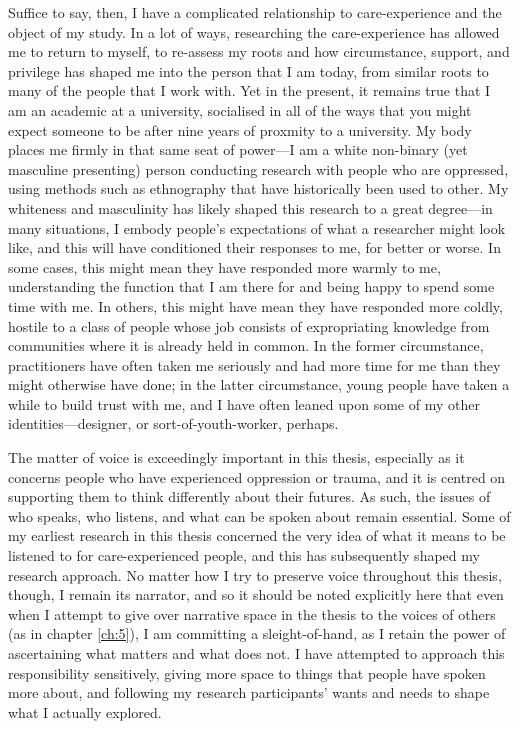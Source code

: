 Suffice to say, then, I have a complicated relationship to care-experience and the object of my study. In a lot of ways, researching the care-experience has allowed me to return to myself, to re-assess my roots and how circumstance, support, and privilege has shaped me into the person that I am today, from similar roots to many of the people that I work with. Yet in the present, it remains true that I am an academic at a university, socialised in all of the ways that you might expect someone to be after nine years of proxmity to a university. My body places me firmly in that same seat of power—I am a white non-binary (yet masculine presenting) person conducting research with people who are oppressed, using methods such as ethnography that have historically been used to other. My whiteness and masculinity has likely shaped this research to a great degree—in many situations, I embody people’s expectations of what a researcher might look like, and this will have conditioned their responses to me, for better or worse. In some cases, this might mean they have responded more warmly to me, understanding the function that I am there for and being happy to spend some time with me. In others, this might have mean they have responded more coldly, hostile to a class of people whose job consists of expropriating knowledge from communities where it is already held in common. In the former circumstance, practitioners have often taken me seriously and had more time for me than they might otherwise have done; in the latter circumstance, young people have taken a while to build trust with me, and I have often leaned upon some of my other identities—designer, or sort-of-youth-worker, perhaps. 

The matter of voice is exceedingly important in this thesis, especially as it concerns people who have experienced oppression or trauma, and it is centred on supporting them to think differently about their futures. As such, the issues of who speaks, who listens, and what can be spoken about remain essential. Some of my earliest research in this thesis concerned the very idea of what it means to be listened to for care-experienced people, and this has subsequently shaped my research approach. No matter how I try to preserve voice throughout this thesis, though, I remain its narrator, and so it should be noted explicitly here that even when I attempt to give over narrative space in the thesis to the voices of others (as in chapter \ref{ch:5}), I am committing a sleight-of-hand, as I retain the power of ascertaining what matters and what does not. I have attempted to approach this responsibility sensitively, giving more space to things that people have spoken more about, and following my research participants’ wants and needs to shape what I actually explored. 

